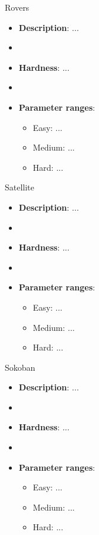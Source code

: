 \documentclass[aspectratio=169,xcolor=dvipsnames]{beamer}
\begin{document}
\begin{frame}{Rovers}

    \begin{itemize}
        \item \textbf{Description}: ...
        \item[]
        \item \textbf{Hardness}: ...
        \item[]
        \item \textbf{Parameter ranges}:
        \begin{itemize}
            \item Easy: ...
            \item Medium: ...
            \item Hard: ...
        \end{itemize}
    \end{itemize}

\end{frame}


\begin{frame}{Satellite}

    \begin{itemize}
        \item \textbf{Description}: ...
        \item[]
        \item \textbf{Hardness}: ...
        \item[]
        \item \textbf{Parameter ranges}:
        \begin{itemize}
            \item Easy: ...
            \item Medium: ...
            \item Hard: ...
        \end{itemize}
    \end{itemize}

\end{frame}


\begin{frame}{Sokoban}

    \begin{itemize}
        \item \textbf{Description}: ...
        \item[]
        \item \textbf{Hardness}: ...
        \item[]
        \item \textbf{Parameter ranges}:
        \begin{itemize}
            \item Easy: ...
            \item Medium: ...
            \item Hard: ...
        \end{itemize}
    \end{itemize}

\end{frame}
\end{document}
